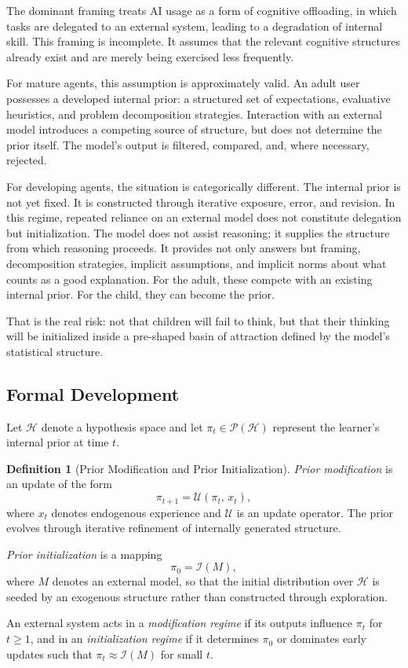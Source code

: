 \documentclass[11pt,a4paper]{article}
\theoremstyle{plain}
\theoremstyle{definition}
\newtheorem{definition}[theorem]{Definition}
\theoremstyle{remark}
\begin{document}
The dominant framing treats AI usage as a form of cognitive offloading, in which
tasks are delegated to an external system, leading to a degradation of internal
skill. This framing is incomplete. It assumes that the relevant cognitive
structures already exist and are merely being exercised less frequently.

For mature agents, this assumption is approximately valid. An adult user
possesses a developed internal prior: a structured set of expectations,
evaluative heuristics, and problem decomposition strategies. Interaction with an
external model introduces a competing source of structure, but does not determine
the prior itself. The model's output is filtered, compared, and, where
necessary, rejected.

For developing agents, the situation is categorically different. The internal
prior is not yet fixed. It is constructed through iterative exposure, error, and
revision. In this regime, repeated reliance on an external model does not
constitute delegation but initialization. The model does not assist reasoning;
it supplies the structure from which reasoning proceeds. It provides not only
answers but framing, decomposition strategies, implicit assumptions, and implicit
norms about what counts as a good explanation. For the adult, these compete with
an existing internal prior. For the child, they can become the prior.

That is the real risk: not that children will fail to think, but that their
thinking will be initialized inside a pre-shaped basin of attraction defined by
the model's statistical structure.

\subsection{Formal Development}

Let $\mathcal{H}$ denote a hypothesis space and let
$\pi_t \in \mathcal{P}(\mathcal{H})$ represent the learner's internal prior at
time $t$.

\begin{definition}[Prior Modification and Prior Initialization]
\emph{Prior modification} is an update of the form
\[
  \pi_{t+1} = \mathcal{U}(\pi_t,\, x_t),
\]
where $x_t$ denotes endogenous experience and $\mathcal{U}$ is an update
operator. The prior evolves through iterative refinement of internally generated
structure.

\emph{Prior initialization} is a mapping
\[
  \pi_0 = \mathcal{I}(M),
\]
where $M$ denotes an external model, so that the initial distribution over
$\mathcal{H}$ is seeded by an exogenous structure rather than constructed
through exploration.

An external system acts in a \emph{modification regime} if its outputs influence
$\pi_t$ for $t \geq 1$, and in an \emph{initialization regime} if it determines
$\pi_0$ or dominates early updates such that $\pi_t \approx \mathcal{I}(M)$ for
small $t$.
\end{definition}
\end{document}
